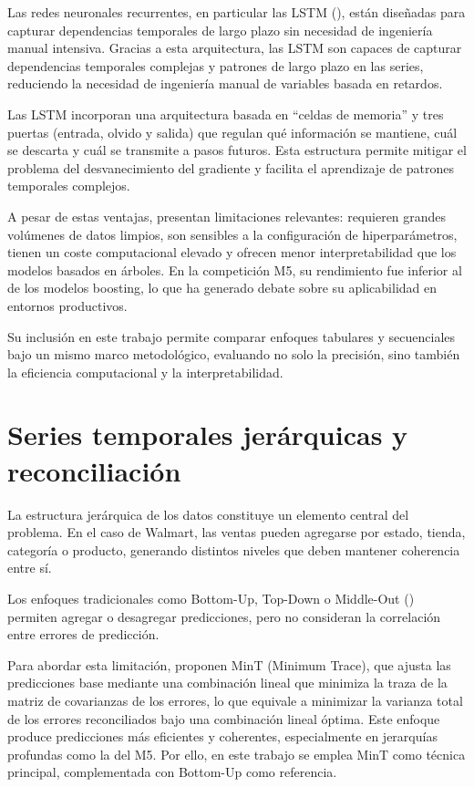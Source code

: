 \documentclass[IB,BIB]{TFUOC}%
\begin{document}
Las redes neuronales recurrentes, en particular las LSTM (\cite{hochreiter1997}), 
están diseñadas para capturar dependencias
temporales de largo plazo sin necesidad de ingeniería manual intensiva.
Gracias a esta arquitectura, las LSTM son capaces de capturar
dependencias temporales complejas y patrones de largo plazo en las
series, reduciendo la necesidad de ingeniería manual de variables basada
en retardos.

Las LSTM incorporan una arquitectura basada en
``celdas de memoria'' y tres puertas (entrada, olvido y salida) que
regulan qué información se mantiene, cuál se descarta y cuál se
transmite a pasos futuros. Esta estructura permite mitigar el problema
del desvanecimiento del gradiente y facilita el aprendizaje de patrones
temporales complejos.

A pesar de estas ventajas, presentan limitaciones
relevantes: requieren grandes volúmenes de datos limpios, son sensibles
a la configuración de hiperparámetros, tienen un coste computacional
elevado y ofrecen menor interpretabilidad que los modelos basados en
árboles. En la competición M5, su rendimiento fue inferior al de los
modelos boosting, lo que ha generado debate sobre su aplicabilidad en
entornos productivos.

Su inclusión en este trabajo permite comparar enfoques
tabulares y secuenciales bajo un mismo marco metodológico, evaluando no
solo la precisión, sino también la eficiencia computacional y la
interpretabilidad.

\section{Series temporales jerárquicas y reconciliación}

La estructura jerárquica de los datos constituye un elemento central del
problema. En el caso de Walmart, las ventas pueden agregarse por estado,
tienda, categoría o producto, generando distintos niveles que deben
mantener coherencia entre sí.

Los enfoques tradicionales como Bottom-Up, Top-Down o Middle-Out
(\cite{hyndman2011}) permiten agregar o desagregar predicciones, pero
no consideran la correlación entre errores de predicción.

Para abordar esta limitación, \cite{wickramasuriya2019} proponen MinT
(Minimum Trace), que ajusta las predicciones base mediante una
combinación lineal que minimiza la traza de la matriz de covarianzas de
los errores, lo que equivale a minimizar la varianza total de los
errores reconciliados bajo una combinación lineal óptima. Este enfoque
produce predicciones más eficientes y coherentes, especialmente en
jerarquías profundas como la del M5. Por ello, en este trabajo se emplea
MinT como técnica principal, complementada con Bottom-Up como
referencia.
\end{document}
